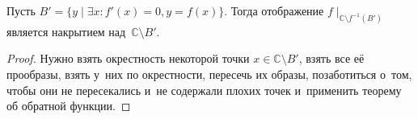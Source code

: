 \documentclass{article}
\begin{document}
\begin{claim}
	Пусть $B' = \{y \mid \exists x: f'(x) = 0, y = f(x)\}$. Тогда отображение
	$f\mid_{\mathbb{C} \setminus f^{-1}(B')}$ является накрытием над~$\mathbb{C}
	\setminus B'$.
\end{claim}
\begin{proof}
	Нужно взять окрестность некоторой точки $x \in \mathbb{C} \setminus B'$, взять
	все её прообразы, взять у~них по окрестности, пересечь их образы, позаботиться
	о~том, чтобы они не пересекались и~не содержали плохих точек и~применить
	теорему об обратной функции.
\end{proof}
\end{document}
